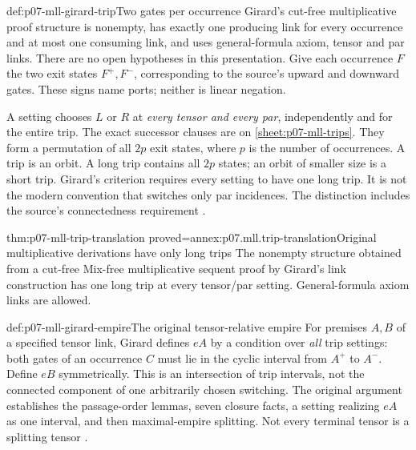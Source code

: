\begin{hbdefinition}{def:p07-mll-girard-trip}{Two gates per occurrence}
Girard's cut-free multiplicative proof structure is nonempty, has exactly
one producing link for every occurrence and at most one consuming link,
and uses general-formula axiom, tensor and par links. There are no open
hypotheses in this presentation. Give each occurrence \(F\) the two
exit states \(F^+,F^-\), corresponding to the source's upward and
downward gates. These signs name ports; neither is linear negation.

A setting chooses \(L\) or \(R\) at \emph{every tensor and every par},
independently and for the entire trip. The exact successor clauses
are on \cref{sheet:p07-mll-trips}. They form a permutation of all
\(2p\) exit states, where \(p\) is the number of occurrences. A trip is
an orbit. A long trip contains all \(2p\) states; an orbit of smaller
size is a short trip. Girard's criterion requires every setting to have
one long trip. It is not the modern convention that switches only par
incidences. The distinction includes the source's connectedness
requirement \cite[Definitions~2.1, 2.4--2.5, pp.~29--33]{Girard1987AuthorHosted}.
\end{hbdefinition}

\begin{hbtheorem}{thm:p07-mll-trip-translation}
 {proved=annex:p07.mll.trip-translation}{Original multiplicative derivations have only long trips}
The nonempty structure obtained from a cut-free Mix-free multiplicative
sequent proof by Girard's link construction has one long trip at every
tensor/par setting. General-formula axiom links are allowed.
\end{hbtheorem}

\begin{hbdefinition}{def:p07-mll-girard-empire}{The original tensor-relative empire}
For premises \(A,B\) of a specified tensor link, Girard defines \(eA\)
by a condition over \emph{all} trip settings: both gates of an occurrence
\(C\) must lie in the cyclic interval from \(A^+\) to \(A^-\).
Define \(eB\) symmetrically. This is an intersection of trip intervals,
not the connected component of one arbitrarily chosen switching.
The original argument establishes the passage-order lemmas, seven
closure facts, a setting realizing \(eA\) as one interval, and then
maximal-empire splitting. Not every terminal tensor is a splitting
tensor \cite[pp.~36--40, Lemmas~2.9.1--2.9.4 and Theorems~2.9.5--2.9.7]
{Girard1987AuthorHosted}.
\end{hbdefinition}

